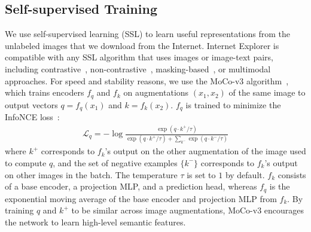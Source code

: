 \subsection{Self-supervised Training}
\label{subsec:ssl}

We use self-supervised learning (SSL) to learn useful representations from the unlabeled images that we download from the Internet. 
Internet Explorer is compatible with any SSL algorithm that uses images or image-text pairs, including contrastive~\cite{he2020momentum,chen2020simple}, non-contrastive~\cite{grill2020bootstrap,zbontar2021barlow,bardes2021vicreg,caron2021emerging}, masking-based~\cite{bao2021beit,he2022masked}, or multimodal~\cite{radford2021learning} approaches. 
For speed and stability reasons, we use the MoCo-v3 algorithm~\cite{chen2021empirical}, which trains encoders $f_q$ and $f_k$ on augmentations $(x_1, x_2)$ of the same image to output vectors $q = f_q(x_1)$ and $k = f_k(x_2)$. $f_q$ is trained to minimize the InfoNCE loss~\cite{oord2018representation}:
\begin{align}
    \mathcal L_q = -\log \frac{\exp(q \cdot k^+ / \tau)}{\exp (q \cdot k^+ / \tau) + \sum_{k^-} \exp (q \cdot k^- / \tau) }
    \label{eq:moco_loss}
\end{align}
where $k^+$ corresponds to $f_k$'s output on the other augmentation of the image used to compute $q$, and the set of negative examples $\{k^-\}$ corresponds to $f_k$'s output on other images in the batch. The temperature $\tau$ is set to $1$ by default. $f_k$ consists of a base encoder, a projection MLP, and a prediction head, whereas $f_q$ is the exponential moving average of the base encoder and projection MLP from $f_k$. By training $q$ and $k^+$ to be similar across image augmentations, MoCo-v3 encourages the network to learn high-level semantic features. 


